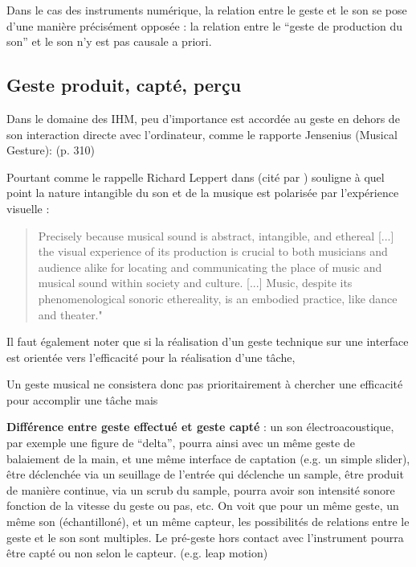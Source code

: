 Dans le cas des instruments numérique, la relation entre le geste et le son se pose d'une manière précisément opposée : la relation entre le ``geste de production du son'' et le son n'y est pas causale a priori.

\subsection{Geste produit, capté, perçu}

Dans le domaine des IHM, peu d'importance est accordée au geste en dehors de son interaction directe avec l'ordinateur, comme le rapporte Jensenius (Musical Gesture):
(p. 310)\cite{kurtenbach_art_1990}

Pourtant comme le rappelle Richard Leppert dans \cite{leppert_sight_1993} (cité par \cite{iazzetta_meaning_2000}) souligne à quel point la nature intangible du son et de la musique est polarisée par l'expérience visuelle :
\begin{quotation}
Precisely because musical sound is abstract, intangible, and ethereal [...] the visual experience of its production is crucial to both musicians and audience alike for locating and communicating the place of music and musical sound within society and culture. [...] Music, despite its phenomenological sonoric ethereality, is an embodied practice, like dance and theater." 
\end{quotation}

Il faut également noter que si la réalisation d'un geste technique sur une interface est orientée vers l'efficacité pour la réalisation d'une tâche, 

Un geste musical ne consistera donc pas prioritairement à chercher une efficacité pour accomplir une tâche mais 



\textbf{Différence entre geste effectué et geste capté} : un son électroacoustique, par exemple une figure de ``delta'', pourra ainsi avec un même geste de balaiement de la main, et une même interface de captation (e.g. un simple slider), être déclenchée via un seuillage de l'entrée qui déclenche un sample, être produit de manière continue, via un scrub du sample, pourra avoir son intensité sonore fonction de la vitesse du geste ou pas, etc. On voit que pour un même geste, un même son (échantilloné), et un même capteur, les possibilités de relations entre le geste et le son sont multiples. Le pré-geste hors contact avec l'instrument pourra être capté ou non selon le capteur. (e.g. leap motion)



